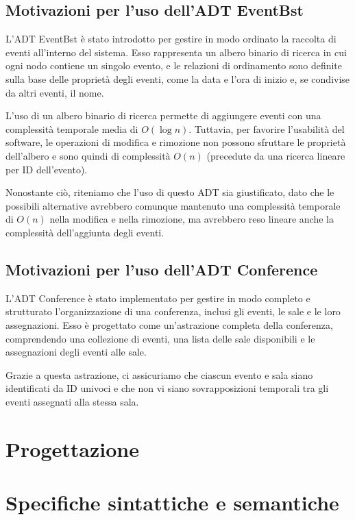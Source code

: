 \documentclass[11pt]{scrartcl} %
\begin{document}
\subsection{Motivazioni per l'uso dell'ADT EventBst}

L'ADT EventBst è stato introdotto per gestire in modo ordinato la raccolta di eventi all'interno del sistema. Esso rappresenta un albero binario di ricerca in cui ogni nodo contiene un singolo evento, e le relazioni di ordinamento sono definite sulla base delle proprietà degli eventi, come la data e l'ora di inizio e, se condivise da altri eventi, il nome.

L'uso di un albero binario di ricerca permette di aggiungere eventi con una complessità temporale media di $O(\log{n})$. Tuttavia, per favorire l'usabilità del software, le operazioni di modifica e rimozione non possono sfruttare le proprietà dell'albero e sono quindi di complessità $O(n)$ (precedute da una ricerca lineare per ID dell'evento).

Nonostante ciò, riteniamo che l'uso di questo ADT sia giustificato, dato che le possibili alternative avrebbero comunque mantenuto una complessità temporale di $O(n)$ nella modifica e nella rimozione, ma avrebbero reso lineare anche la complessità dell'aggiunta degli eventi.

\subsection{Motivazioni per l'uso dell'ADT Conference}

L'ADT Conference è stato implementato per gestire in modo completo e strutturato l'organizzazione di una conferenza, inclusi gli eventi, le sale e le loro assegnazioni. Esso è progettato come un'astrazione completa della conferenza, comprendendo una collezione di eventi, una lista delle sale disponibili e le assegnazioni degli eventi alle sale.

Grazie a questa astrazione, ci assicuriamo che ciascun evento e sala siano identificati da ID univoci e che non vi siano sovrapposizioni temporali tra gli eventi assegnati alla stessa sala.

\section{Progettazione}

\section{Specifiche sintattiche e semantiche}
\end{document}
